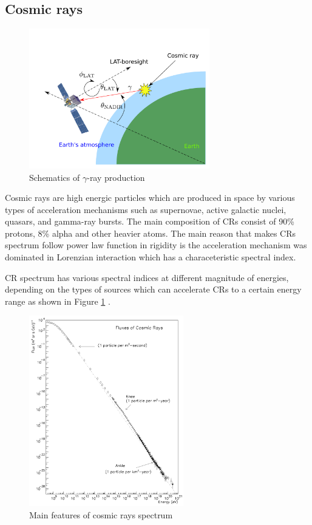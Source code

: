 \subsection{Cosmic rays}
\begin{figure}[h!]
    \centering
    \includegraphics[width=0.7\textwidth]{img/gamma_production_schematic}
    \caption{Schematics of $\gamma$-ray production}
\end{figure}
Cosmic rays are high energic particles which are produced in space by various types
of acceleration mechanisms such as supernovae, active galactic nuclei, quasars, and
gamma-ray bursts. The main composition of CRs consist of 90\% protons, 8\% alpha
and other heavier atoms. The main reason that makes CRs spectrum follow power
law function in rigidity is the acceleration mechanism was dominated in
Lorenzian interaction which has a characeteristic spectral index.

\par CR spectrum has various spectral indices at different magnitude of energies, depending on the types of sources which can accelerate CRs to a certain energy range as shown in Figure \ref{fig:cr_famous_spectrum} \cite{Swordy2001}.
\begin{figure}[h!]
\centering
    \includegraphics[width=0.6\textwidth]{img/Swordy}
    \caption{Main features of cosmic rays spectrum}
    \label{fig:cr_famous_spectrum}
\end{figure}

